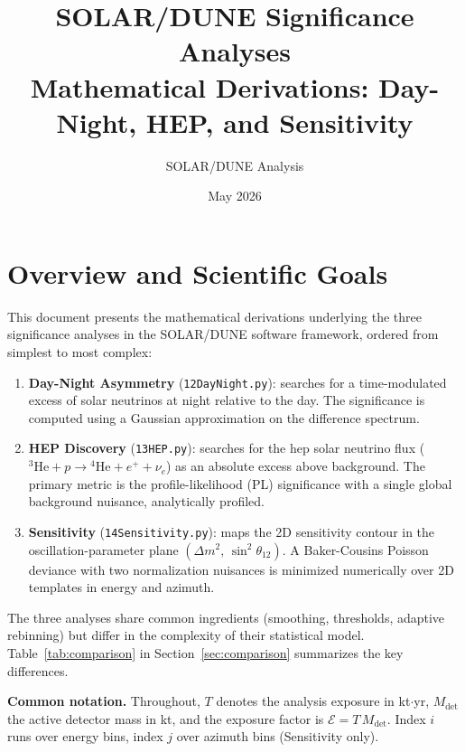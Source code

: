 \documentclass[12pt,a4paper]{article}
\title{%
  SOLAR/DUNE Significance Analyses\\
  \large Mathematical Derivations: Day-Night, HEP, and Sensitivity%
}
\author{SOLAR/DUNE Analysis}
\date{May 2026}
\begin{document}
\maketitle
\tableofcontents
\newpage

\section{Overview and Scientific Goals}
\label{sec:overview}

This document presents the mathematical derivations underlying the three
significance analyses in the SOLAR/DUNE software framework,
ordered from simplest to most complex:

\begin{enumerate}[leftmargin=*]
  \item \textbf{Day-Night Asymmetry} (\texttt{12DayNight.py}):
    searches for a time-modulated excess of solar neutrinos at night
    relative to the day.  The significance is computed using a
    Gaussian approximation on the difference spectrum.

  \item \textbf{HEP Discovery} (\texttt{13HEP.py}):
    searches for the hep solar neutrino flux ($^3\mathrm{He}+p \to
    {}^4\mathrm{He}+e^++\nu_e$) as an absolute excess above background.
    The primary metric is the profile-likelihood (PL) significance
    with a single global background nuisance, analytically profiled.

  \item \textbf{Sensitivity} (\texttt{14Sensitivity.py}):
    maps the 2D sensitivity contour in the oscillation-parameter plane
    $(\Delta m^2,\,\sin^2\theta_{12})$.
    A Baker-Cousins Poisson deviance with two normalization nuisances
    is minimized numerically over 2D templates in energy and azimuth.
\end{enumerate}

The three analyses share common ingredients (smoothing, thresholds,
adaptive rebinning) but differ in the complexity of their statistical model.
Table~\ref{tab:comparison} in Section~\ref{sec:comparison} summarizes
the key differences.

\medskip
\noindent\textbf{Common notation.}
Throughout, $T$ denotes the analysis exposure in kt$\cdot$yr,
$M_{\mathrm{det}}$ the active detector mass in kt,
and the exposure factor is $\mathcal{E} = T\,M_{\mathrm{det}}$.
Index $i$ runs over energy bins, index $j$ over azimuth bins (Sensitivity only).
\end{document}
